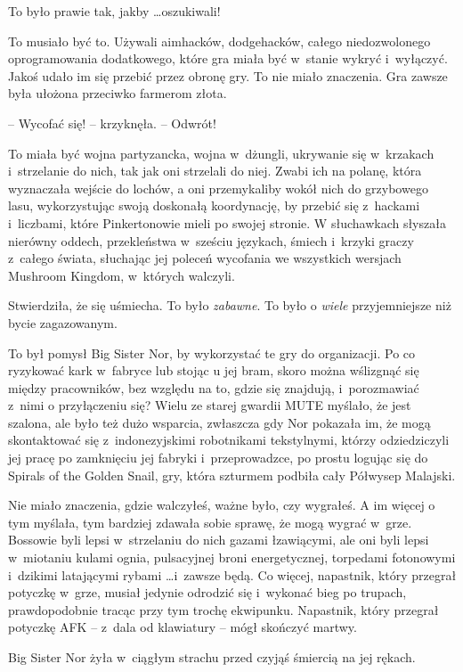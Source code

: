 \documentclass[oneside,polish,11pt,rmheadings]{mwbk}
\begin{document}
To było prawie tak, jakby \ldots  oszukiwali! 


To musiało być to. Używali aimhacków, dodgehacków, całego niedozwolonego oprogramowania dodatkowego, które gra miała być w~stanie wykryć i~wyłączyć. Jakoś udało im się przebić przez obronę gry. To nie miało znaczenia. Gra zawsze była ułożona przeciwko farmerom złota. 


-- Wycofać się! -- krzyknęła. -- Odwrót! 

To miała być wojna partyzancka, wojna w~dżungli, ukrywanie się w~krzakach i~strzelanie do nich, tak jak oni strzelali do niej. Zwabi ich na polanę, która wyznaczała wejście do lochów, a oni przemykaliby wokół nich do grzybowego lasu, wykorzystując swoją doskonałą koordynację, by przebić się z~hackami i~liczbami, które Pinkertonowie mieli po swojej stronie. W słuchawkach słyszała nierówny oddech, przekleństwa w~sześciu językach, śmiech i~krzyki graczy z~całego świata, słuchając jej poleceń wycofania we wszystkich wersjach Mushroom Kingdom, w~których walczyli. 


Stwierdziła, że się uśmiecha. To było \textit{zabawne}. To było o \textit{wiele }przyjemniejsze niż bycie zagazowanym. 


To był pomysł Big Sister Nor, by wykorzystać te gry do organizacji. Po co ryzykować kark w~fabryce lub stojąc u jej bram, skoro można wślizgnąć się między pracowników, bez względu na to, gdzie się znajdują, i~porozmawiać z~nimi o przyłączeniu się? Wielu ze starej gwardii MUTE myślało, że jest szalona, ale było też dużo wsparcia, zwłaszcza gdy Nor pokazała im, że mogą skontaktować się z~indonezyjskimi robotnikami tekstylnymi, którzy odziedziczyli jej pracę po zamknięciu jej fabryki i~przeprowadzce, po prostu logując się do Spirals of the Golden Snail, gry, która szturmem podbiła cały Półwysep Malajski. 


Nie miało znaczenia, gdzie walczyłeś, ważne było, czy wygrałeś. A im więcej o tym myślała, tym bardziej zdawała sobie sprawę, że mogą wygrać w~grze. Bossowie byli lepsi w~strzelaniu do nich gazami łzawiącymi, ale oni byli lepsi w~miotaniu kulami ognia, pulsacyjnej broni energetycznej, torpedami fotonowymi i~dzikimi latającymi rybami \ldots  i~zawsze będą. Co więcej, napastnik, który przegrał potyczkę w~grze, musiał jedynie odrodzić się i~wykonać bieg po trupach, prawdopodobnie tracąc przy tym trochę ekwipunku. Napastnik, który przegrał potyczkę AFK -- z~dala od klawiatury -- mógł skończyć martwy. 


Big Sister Nor żyła w~ciągłym strachu przed czyjąś śmiercią na jej rękach. 
\end{document}

